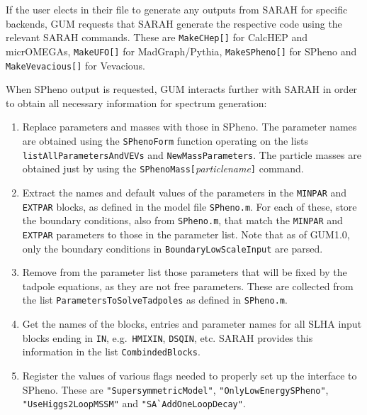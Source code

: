 \documentclass[pdftex,twocolumn,epjc3_preprint,runningheads]{svjour3}
\renewcommand{\_}{\discretionary{\underscore}{}{\underscore}}
\newcommand\term[1]{{\lstset{style=terminal}\lstinline!#1!\lstset{style=cpp}}}
\newcommand\mathematica[1]{{\lstset{style=Mathematica}\lstinline!#1!\lstset{style=cpp}}}
\newcommand{\metavarf}[1]{\textit{\color{darkgreen}\footnotesize\textrm{#1}}}
\newcommand{\metavar}{\metavarf}
\newcommand{\pythia}{\textsf{Pythia}\xspace}
\newcommand{\mo}{\micromegas}
\newcommand{\micromegas}{\textsf{micrOMEGAs}\xspace}
\newcommand{\gum}{\textsf{GUM}\xspace}
\newcommand{\dgum}{\!\!\term{.gum}\!\xspace}
\newcommand{\sarah}{\textsf{SARAH}\xspace}
\newcommand{\CH}{\textsf{CalcHEP}\xspace}
\newcommand{\MG}{\textsf{MadGraph}\xspace}
\newcommand{\veva}{\textsf{Vevacious}\xspace}
\newcommand{\spheno}{\textsf{SPheno}\xspace}
\newcommand{\pn}{\metavar{particle\_name}}
\begin{document}
If the user elects in their \dgum file to generate any outputs from \sarah for specific backends, \gum requests that \sarah generate the respective code using the relevant \sarah commands.  These are \mathematica{MakeCHep[]} for \CH and \mo, \mathematica{MakeUFO[]} for \MG/\pythia, \mathematica{MakeSPheno[]} for \spheno and \mathematica{MakeVevacious[]} for \veva.

When \spheno output is requested, \gum interacts further with \sarah in order to obtain all necessary information for spectrum generation:
%
\begin{enumerate}
 \item Replace parameters and masses with those in \spheno. The parameter names are obtained using the \mathematica{SPhenoForm} function operating on the lists \mathematica{listAllParametersAndVEVs} and \mathematica{NewMassParameters}. The particle masses are obtained just by using the \mathematica{SPhenoMass[}\pn\mathematica{]} command.

 \item Extract the names and default values of the parameters in the \mathematica{MINPAR} and \mathematica{EXTPAR} blocks, as defined in the model file \term{SPheno.m}. For each of these, store the boundary conditions, also from \term{SPheno.m}, that match the \mathematica{MINPAR} and \mathematica{EXTPAR} parameters to those in the parameter list. Note that as of \gum \textsf{1.0}, only the boundary conditions in \mathematica{BoundaryLowScaleInput} are parsed.

 \item Remove from the parameter list those parameters that will be fixed by the tadpole equations, as they are not free parameters. These are collected from the list \mathematica{ParametersToSolveTadpoles} as defined in \term{SPheno.m}.

 \item Get the names of the blocks, entries and parameter names for all SLHA input blocks ending in \mathematica{IN}, e.g.\ \mathematica{HMIXIN}, \mathematica{DSQIN}, etc. \sarah provides this information in the list \mathematica{CombindedBlocks}.

 \item Register the values of various flags needed to properly set up the interface to \spheno.  These are \term{"SupersymmetricModel"}, \term{"OnlyLowEnergySPheno"}, \term{"UseHiggs2LoopMSSM"} and \term{"SA`AddOneLoopDecay"}.

\end{enumerate}
\end{document}
